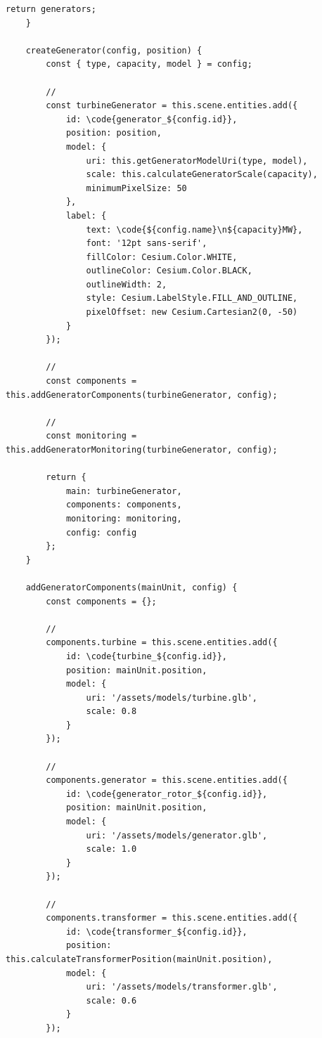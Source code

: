 \begin{lstlisting}[style=javascript]
        return generators;
    }
    
    createGenerator(config, position) {
        const { type, capacity, model } = config;
        
        // 
        const turbineGenerator = this.scene.entities.add({
            id: \code{generator_${config.id}},
            position: position,
            model: {
                uri: this.getGeneratorModelUri(type, model),
                scale: this.calculateGeneratorScale(capacity),
                minimumPixelSize: 50
            },
            label: {
                text: \code{${config.name}\n${capacity}MW},
                font: '12pt sans-serif',
                fillColor: Cesium.Color.WHITE,
                outlineColor: Cesium.Color.BLACK,
                outlineWidth: 2,
                style: Cesium.LabelStyle.FILL_AND_OUTLINE,
                pixelOffset: new Cesium.Cartesian2(0, -50)
            }
        });
        
        // 
        const components = this.addGeneratorComponents(turbineGenerator, config);
        
        // 
        const monitoring = this.addGeneratorMonitoring(turbineGenerator, config);
        
        return {
            main: turbineGenerator,
            components: components,
            monitoring: monitoring,
            config: config
        };
    }
    
    addGeneratorComponents(mainUnit, config) {
        const components = {};
        
        // 
        components.turbine = this.scene.entities.add({
            id: \code{turbine_${config.id}},
            position: mainUnit.position,
            model: {
                uri: '/assets/models/turbine.glb',
                scale: 0.8
            }
        });
        
        // 
        components.generator = this.scene.entities.add({
            id: \code{generator_rotor_${config.id}},
            position: mainUnit.position,
            model: {
                uri: '/assets/models/generator.glb',
                scale: 1.0
            }
        });
        
        // 
        components.transformer = this.scene.entities.add({
            id: \code{transformer_${config.id}},
            position: this.calculateTransformerPosition(mainUnit.position),
            model: {
                uri: '/assets/models/transformer.glb',
                scale: 0.6
            }
        });
        

\end{lstlisting}
